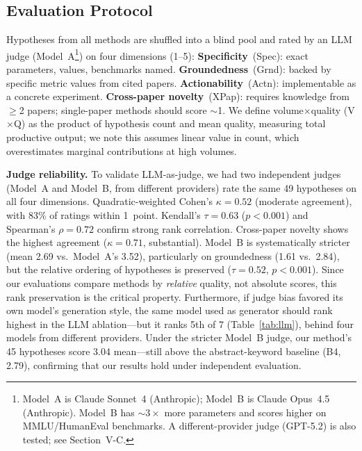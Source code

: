 \documentclass[conference]{IEEEtran}
\begin{document}
\subsection{Evaluation Protocol}

Hypotheses from all methods are shuffled into a blind pool and rated by an LLM judge (Model~A\footnote{Model~A is Claude Sonnet~4 (Anthropic); Model~B is Claude Opus~4.5 (Anthropic). Model~B has ${\sim}3\times$ more parameters and scores higher on MMLU/HumanEval benchmarks. A different-provider judge (GPT-5.2) is also tested; see Section~V-C.}) on four dimensions (1--5):
\textbf{Specificity}~(Spec): exact parameters, values, benchmarks named.
\textbf{Groundedness}~(Grnd): backed by specific metric values from cited papers.
\textbf{Actionability}~(Actn): implementable as a concrete experiment.
\textbf{Cross-paper novelty}~(XPap): requires knowledge from $\geq$2 papers; single-paper methods should score ${\sim}$1.
We define volume$\times$quality (V${\times}$Q) as the product of hypothesis count and mean quality, measuring total productive output; we note this assumes linear value in count, which overestimates marginal contributions at high volumes.

\textbf{Judge reliability.}
To validate LLM-as-judge, we had two independent judges (Model~A and Model~B, from different providers) rate the same 49 hypotheses on all four dimensions.
Quadratic-weighted Cohen's $\kappa = 0.52$ (moderate agreement), with 83\% of ratings within 1~point.
Kendall's $\tau = 0.63$ ($p < 0.001$) and Spearman's $\rho = 0.72$ confirm strong rank correlation.
Cross-paper novelty shows the highest agreement ($\kappa = 0.71$, substantial).
Model~B is systematically stricter (mean 2.69 vs.\ Model~A's 3.52), particularly on groundedness (1.61 vs.\ 2.84), but the relative ordering of hypotheses is preserved ($\tau = 0.52$, $p < 0.001$).
Since our evaluations compare methods by \emph{relative} quality, not absolute scores, this rank preservation is the critical property.
Furthermore, if judge bias favored its own model's generation style, the same model used as generator should rank highest in the LLM ablation---but it ranks 5th of 7 (Table~\ref{tab:llm}), behind four models from different providers.
Under the stricter Model~B judge, our method's 45 hypotheses score 3.04 mean---still above the abstract-keyword baseline (B4, 2.79), confirming that our results hold under independent evaluation.
\end{document}
